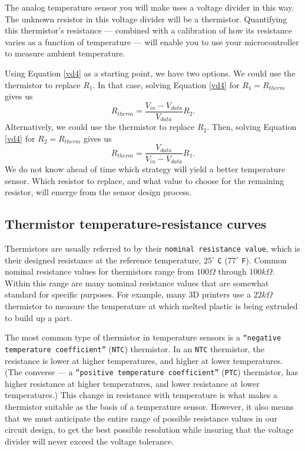 The analog temperature sensor you will make uses a voltage divider in this way. 
The unknown resistor in this voltage divider will be a thermistor.
Quantifying this thermistor's resistance --- combined with a calibration of how its resistance varies as a function of temperature --- will enable you to use your microcontroller to measure ambient temperature.

Using Equation \ref{vd4} as a starting point, we have two options.
We could use the thermistor to replace $R_1$.
In that case, solving Equation \ref{vd4} for $R_1 = R_{therm}$ gives us 
\begin{equation}\label{therm1}
R_{therm} = \frac{V_{in}-V_{data}}{V_{data}}R_2.
\end{equation}
Alternatively, we could use the thermistor to replace $R_2$.
Then, solving Equation \ref{vd4} for $R_2 = R_{therm}$ gives us 
\begin{equation}\label{therm2}
R_{therm} = \frac{V_{data}}{V_{in}-V_{data}}R_1.
\end{equation}
We do not know ahead of time which strategy will yield a better temperature sensor.
Which resistor to replace, and what value to choose for the remaining resistor, will emerge from the sensor design process.

\subsection{Thermistor temperature-resistance curves}
Thermistors are usually referred to by their \texttt{nominal resistance value}, which is their designed resistance at the reference temperature, $25^\circ$ \texttt{C} ($77^\circ$ \texttt{F}).
Common nominal resistance values for thermistors range from $100\Omega$ through $100k\Omega$.
Within this range are many nominal resistance values that are somewhat standard for specific purposes.
For example, many 3D printers use a $22k\Omega$ thermistor to measure the temperature at which melted plastic is being extruded to build up a part. 

The most common type of thermistor in temperature sensors is a \texttt{``negative temperature coefficient''} (\texttt{NTC}) thermistor.
In an \texttt{NTC} thermistor, the resistance is lower at higher temperatures, and higher at lower temperatures.
(The converse --- a \texttt{``positive temperature coefficient''} (\texttt{PTC}) thermistor, has higher resistance at higher temperatures, and lower resistance at lower temperatures.)
This change in resistance with temperature is what makes a thermistor suitable as the basis of a temperature sensor. 
However, it also means that we must anticipate the entire range of possible resistance values in our circuit design, to get the best possible resolution while insuring that the voltage divider will never exceed the \adc voltage tolerance.

